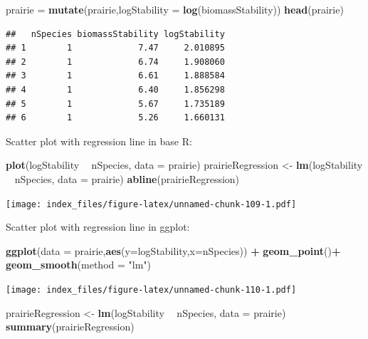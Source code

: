 \documentclass[]{article}
\newenvironment{Shaded}{\begin{snugshade}}{\end{snugshade}}
\newcommand{\DataTypeTok}[1]{\textcolor[rgb]{0.13,0.29,0.53}{#1}}
\newcommand{\KeywordTok}[1]{\textcolor[rgb]{0.13,0.29,0.53}{\textbf{#1}}}
\newcommand{\NormalTok}[1]{#1}
\newcommand{\OperatorTok}[1]{\textcolor[rgb]{0.81,0.36,0.00}{\textbf{#1}}}
\newcommand{\StringTok}[1]{\textcolor[rgb]{0.31,0.60,0.02}{#1}}
\begin{document}
\begin{Shaded}
\begin{Highlighting}[]
\NormalTok{prairie =}\StringTok{ }\KeywordTok{mutate}\NormalTok{(prairie,}\DataTypeTok{logStability =} \KeywordTok{log}\NormalTok{(biomassStability))}
\KeywordTok{head}\NormalTok{(prairie)}
\end{Highlighting}
\end{Shaded}

\begin{verbatim}
##   nSpecies biomassStability logStability
## 1        1             7.47     2.010895
## 2        1             6.74     1.908060
## 3        1             6.61     1.888584
## 4        1             6.40     1.856298
## 5        1             5.67     1.735189
## 6        1             5.26     1.660131
\end{verbatim}

Scatter plot with regression line in base R:

\begin{Shaded}
\begin{Highlighting}[]
\KeywordTok{plot}\NormalTok{(logStability }\OperatorTok{~}\StringTok{ }\NormalTok{nSpecies, }\DataTypeTok{data =}\NormalTok{ prairie) }
\NormalTok{prairieRegression <-}\StringTok{ }\KeywordTok{lm}\NormalTok{(logStability }\OperatorTok{~}\StringTok{ }\NormalTok{nSpecies, }\DataTypeTok{data =}\NormalTok{ prairie)}
\KeywordTok{abline}\NormalTok{(prairieRegression)}
\end{Highlighting}
\end{Shaded}

\texttt{[image: index\_files/figure-latex/unnamed-chunk-109-1.pdf]}

Scatter plot with regression line in ggplot:

\begin{Shaded}
\begin{Highlighting}[]
\KeywordTok{ggplot}\NormalTok{(}\DataTypeTok{data =}\NormalTok{ prairie,}\KeywordTok{aes}\NormalTok{(}\DataTypeTok{y=}\NormalTok{logStability,}\DataTypeTok{x=}\NormalTok{nSpecies)) }\OperatorTok{+}
\StringTok{  }\KeywordTok{geom_point}\NormalTok{()}\OperatorTok{+}
\StringTok{  }\KeywordTok{geom_smooth}\NormalTok{(}\DataTypeTok{method =} \StringTok{"lm"}\NormalTok{)}
\end{Highlighting}
\end{Shaded}

\texttt{[image: index\_files/figure-latex/unnamed-chunk-110-1.pdf]}

\begin{Shaded}
\begin{Highlighting}[]
\NormalTok{prairieRegression <-}\StringTok{ }\KeywordTok{lm}\NormalTok{(logStability }\OperatorTok{~}\StringTok{ }\NormalTok{nSpecies, }\DataTypeTok{data =}\NormalTok{ prairie)}
\KeywordTok{summary}\NormalTok{(prairieRegression)}
\end{Highlighting}
\end{Shaded}
\end{document}
